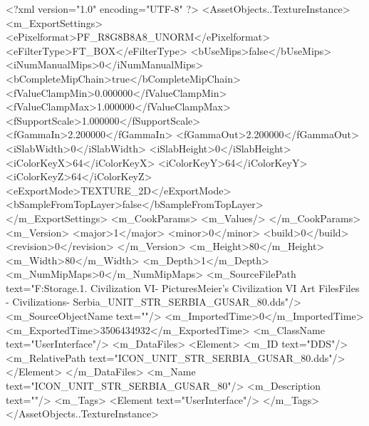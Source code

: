 <?xml version="1.0" encoding="UTF-8" ?>
<AssetObjects..TextureInstance>
	<m_ExportSettings>
		<ePixelformat>PF_R8G8B8A8_UNORM</ePixelformat>
		<eFilterType>FT_BOX</eFilterType>
		<bUseMips>false</bUseMips>
		<iNumManualMips>0</iNumManualMips>
		<bCompleteMipChain>true</bCompleteMipChain>
		<fValueClampMin>0.000000</fValueClampMin>
		<fValueClampMax>1.000000</fValueClampMax>
		<fSupportScale>1.000000</fSupportScale>
		<fGammaIn>2.200000</fGammaIn>
		<fGammaOut>2.200000</fGammaOut>
		<iSlabWidth>0</iSlabWidth>
		<iSlabHeight>0</iSlabHeight>
		<iColorKeyX>64</iColorKeyX>
		<iColorKeyY>64</iColorKeyY>
		<iColorKeyZ>64</iColorKeyZ>
		<eExportMode>TEXTURE_2D</eExportMode>
		<bSampleFromTopLayer>false</bSampleFromTopLayer>
	</m_ExportSettings>
	<m_CookParams>
		<m_Values/>
	</m_CookParams>
	<m_Version>
		<major>1</major>
		<minor>0</minor>
		<build>0</build>
		<revision>0</revision>
	</m_Version>
	<m_Height>80</m_Height>
	<m_Width>80</m_Width>
	<m_Depth>1</m_Depth>
	<m_NumMipMaps>0</m_NumMipMaps>
	<m_SourceFilePath text="F:\Mod Storage\2.1. Civilization VI\Mods\Archive - Pictures\Sid Meier's Civilization VI Art Files\Art Files - Civilizations\Civilization - Serbia\ICON_UNIT_STR_SERBIA_GUSAR_80.dds"/>
	<m_SourceObjectName text=""/>
	<m_ImportedTime>0</m_ImportedTime>
	<m_ExportedTime>3506434932</m_ExportedTime>
	<m_ClassName text="UserInterface"/>
	<m_DataFiles>
		<Element>
			<m_ID text="DDS"/>
			<m_RelativePath text="ICON_UNIT_STR_SERBIA_GUSAR_80.dds"/>
		</Element>
	</m_DataFiles>
	<m_Name text="ICON_UNIT_STR_SERBIA_GUSAR_80"/>
	<m_Description text=""/>
	<m_Tags>
		<Element text="UserInterface"/>
	</m_Tags>
</AssetObjects..TextureInstance>

